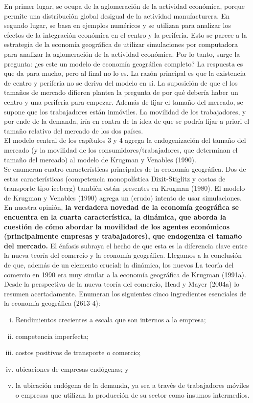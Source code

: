 En primer lugar, se ocupa de la aglomeración de la actividad económica, porque permite una distribución global desigual de la actividad manufacturera. En segundo lugar, se basa en ejemplos numéricos y se utilizan para analizar los efectos de la integración económica en el centro y la periferia. Esto se parece a la estrategia de la economía geográfica de utilizar simulaciones por computadora para analizar la aglomeración de la actividad económica. Por lo tanto, surge la pregunta: ¿es este un modelo de economía geográfica completo? La respuesta es que da para mucho, pero al final no lo es. La razón principal es que la existencia de centro y periferia no se deriva del modelo en sí. La suposición de que el los tamaños de mercado difieren plantea la pregunta de por qué debería haber un centro y una periferia para empezar. Además de fijar el tamaño del mercado, se supone que los trabajadores están inmóviles. La movilidad de los trabajadores, y por ende de la demanda, iría en contra de la idea de que se podría fijar a priori el tamaño relativo del mercado de los dos países.\\
El modelo central de los capítulos 3 y 4 agrega la endogenización del tamaño del mercado (y la movilidad de los consumidores/trabajadores, que determinan el tamaño del mercado) al modelo de Krugman y Venables (1990). \\
Se enumeran cuatro características principales de la economía geográfica. Dos de estas características (competencia monopolística Dixit-Stiglitz y costos de transporte tipo iceberg) también están presentes en Krugman (1980). El modelo de Krugman y Venables (1990) agrega un (crudo) intento de usar simulaciones. En nuestra opinión, \textbf{la verdadera novedad de la economía geográfica se encuentra en la cuarta característica, la dinámica, que aborda la cuestión de cómo abordar la movilidad de los agentes económicos (principalmente empresas y trabajadores), que endogeniza el tamaño del mercado.} El énfasis subraya el hecho de que esta es la diferencia clave entre la nueva teoría del comercio y la economía geográfica. Llegamos a la conclusión de que, además de un elemento crucial: la dinámica, los nuevos La teoría del comercio en 1990 era muy similar a la economía geográfica de Krugman (1991a). \\
Desde la perspectiva de la nueva teoría del comercio, Head y Mayer (2004a) lo resumen acertadamente. Enumeran los siguientes cinco ingredientes esenciales de la economía geográfica (2613-4): 
\begin{enumerate}[(i)]
    \item  Rendimientos crecientes a escala que son internos a la empresa;
    \item competencia imperfecta; 
    \item costos positivos de transporte o comercio; 
    \item ubicaciones de empresas endógenas; y 
    \item la ubicación endógena de la demanda, ya sea a través de trabajadores móviles o empresas que utilizan la producción de su sector como insumos intermedios. 
\end{enumerate}
